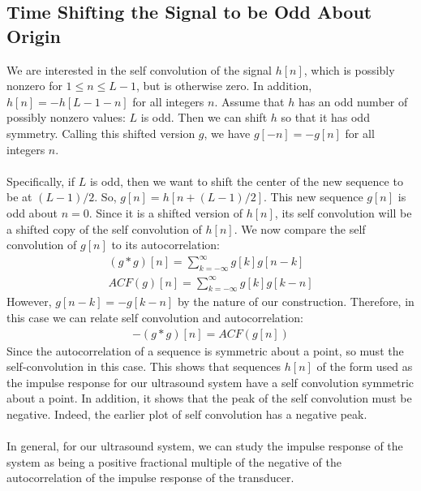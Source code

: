 \documentclass[a4paper]{article}
\begin{document}
\subsection*{Time Shifting the Signal to be Odd About Origin}
We are interested in the self convolution of the signal $h[n]$, which is possibly nonzero for $1 \leq n \leq L -1$, but is otherwise zero. In addition, $h[n] = -h[L-1-n]$ for all integers $n$. Assume that $h$ has an odd number of possibly nonzero values: $L$ is odd. Then we can shift $h$ so that it has odd symmetry. Calling this shifted version $g$, we have $g[-n] = -g[n]$ for all integers $n$.
\\\\
Specifically, if $L$ is odd, then we want to shift the center of the new sequence to be at $(L-1)/2$. So, $g[n] = h[n+(L-1)/2]$. This new sequence $g[n]$ is odd about $n = 0$. Since it is  a shifted version of $h[n]$, its self convolution will be a shifted copy of the self convolution of $h[n]$. We now compare the self convolution of $g[n]$ to its autocorrelation:
\begin{align*}
(g*g)[n] = \sum_{k = -\infty}^{\infty} g[k]g[n-k] \\
ACF(g)[n] = \sum_{k = -\infty}^{\infty} g[k]g[k-n] 
\end{align*}
However, $g[n-k] = -g[k-n]$ by the nature of our construction. Therefore, in this case we can relate self convolution and autocorrelation:
\begin{align*}
-(g*g)[n] = ACF(g[n])
\end{align*}
Since the autocorrelation of a sequence is symmetric about a point, so must the self-convolution in this case.  This shows that sequences $h[n]$ of the form used as the impulse response for our ultrasound system have a self convolution symmetric about a point. In addition, it shows that the peak of the self convolution must be negative. Indeed, the earlier plot of self convolution has a negative peak.
\\\\
In general, for our ultrasound system, we can study the impulse response of the system as being a positive fractional multiple of the negative of the autocorrelation of the impulse response of the transducer.
\end{document}
